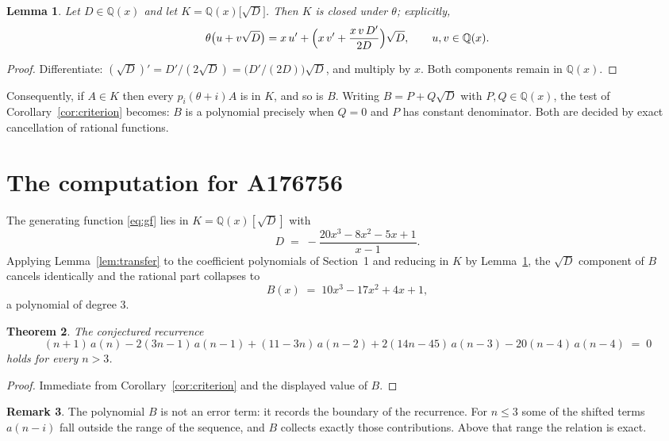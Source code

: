 \documentclass[11pt,a4paper]{article}
\theoremstyle{plain}
\newtheorem{theorem}{Theorem}
\newtheorem{lemma}[theorem]{Lemma}
\theoremstyle{definition}
\newtheorem{remark}[theorem]{Remark}
\begin{document}
\begin{lemma}\label{lem:field}
Let $D\in\mathbb{Q}(x)$ and let $K=\mathbb{Q}(x)\bigl[\sqrt{D}\bigr]$. Then $K$ is closed
under $\theta$; explicitly,
\[
\theta\bigl(u+v\sqrt{D}\bigr)=x\,u'+\Bigl(x\,v'+\frac{x\,v\,D'}{2D}\Bigr)\sqrt{D},
\qquad u,v\in\mathbb{Q}(x).
\]
\end{lemma}

\begin{proof}
Differentiate: $(\sqrt{D})'=D'/(2\sqrt{D})=\bigl(D'/(2D)\bigr)\sqrt{D}$, and multiply by
$x$. Both components remain in $\mathbb{Q}(x)$.
\end{proof}

Consequently, if $A\in K$ then every $p_{i}(\theta+i)A$ is in $K$, and so is $B$. Writing
$B=P+Q\sqrt{D}$ with $P,Q\in\mathbb{Q}(x)$, the test of Corollary~\ref{cor:criterion}
becomes: $B$ is a polynomial precisely when $Q=0$ and $P$ has constant denominator. Both
are decided by exact cancellation of rational functions.

\section{The computation for A176756}

The generating function \eqref{eq:gf} lies in $K=\mathbb{Q}(x)[\sqrt{D}]$ with
\[
D \;=\; - \frac{20 x^{3} - 8 x^{2} - 5 x + 1}{x - 1} .
\]
Applying Lemma~\ref{lem:transfer} to the coefficient polynomials of Section~1 and reducing
in $K$ by Lemma~\ref{lem:field}, the $\sqrt{D}$ component of $B$ cancels identically and
the rational part collapses to
\[
B(x)\;=\;10 x^{3} - 17 x^{2} + 4 x + 1 ,
\]
a polynomial of degree $3$.

\begin{theorem}
The conjectured recurrence
\[
(n + 1)\,a(n) -  2 \left(3 n - 1\right)\,a(n-1) + (11 - 3 n)\,a(n-2) + 2 \left(14 n - 45\right)\,a(n-3) -  20 \left(n - 4\right)\,a(n-4) \;=\;0
\]
holds for every $n>3$.
\end{theorem}

\begin{proof}
Immediate from Corollary~\ref{cor:criterion} and the displayed value of $B$.
\end{proof}

\begin{remark}
The polynomial $B$ is not an error term: it records the boundary of the recurrence. For
$n\le3$ some of the shifted terms $a(n-i)$ fall outside the range of the sequence,
and $B$ collects exactly those contributions. Above that range the relation is exact.
\end{remark}
\end{document}
